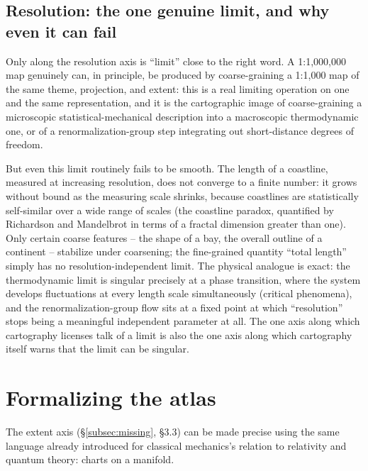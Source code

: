 \subsection{Resolution: the one genuine limit, and why even it can fail}
\label{subsec:resolution}

Only along the resolution axis is ``limit'' close to the right word. A 1:1{,}000{,}000 map genuinely can, in principle, be produced by coarse-graining a 1:1{,}000 map of the same theme, projection, and extent: this is a real limiting operation on one and the same representation, and it is the cartographic image of coarse-graining a microscopic statistical-mechanical description into a macroscopic thermodynamic one, or of a renormalization-group step integrating out short-distance degrees of freedom.

But even this limit routinely fails to be smooth. The length of a coastline, measured at increasing resolution, does not converge to a finite number: it grows without bound as the measuring scale shrinks, because coastlines are statistically self-similar over a wide range of scales (the coastline paradox, quantified by Richardson and Mandelbrot in terms of a fractal dimension greater than one). Only certain coarse features -- the shape of a bay, the overall outline of a continent -- stabilize under coarsening; the fine-grained quantity ``total length'' simply has no resolution-independent limit. The physical analogue is exact: the thermodynamic limit is singular precisely at a phase transition, where the system develops fluctuations at every length scale simultaneously (critical phenomena), and the renormalization-group flow sits at a fixed point at which ``resolution'' stops being a meaningful independent parameter at all. The one axis along which cartography licenses talk of a limit is also the one axis along which cartography itself warns that the limit can be singular.

\section{Formalizing the atlas}
\label{sec:atlas}

The extent axis (\S\ref{subsec:missing}, \S3.3) can be made precise using the same language already introduced for classical mechanics's relation to relativity and quantum theory: charts on a manifold.

